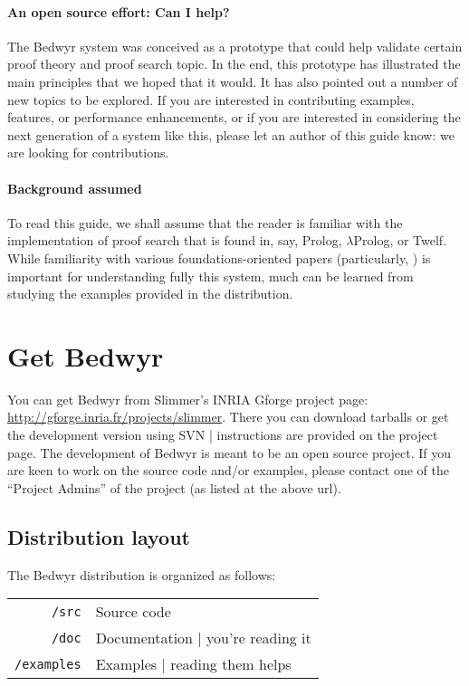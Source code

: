 \documentclass{article}
\newcommand{\lp}{$\lambda$Prolog}
\begin{document}
\paragraph{An open source effort: Can I help?}
The Bedwyr system was conceived as a prototype that could help
validate certain proof theory and proof search topic.  In the end,
this prototype has illustrated the main principles that we hoped that
it would.  It has also pointed out a number of new topics to be
explored.  If you are interested in contributing examples, features,
or performance enhancements, or if you are interested in considering
the next generation of a system like this, please let an author of
this guide know: we are looking for contributions.

\paragraph{Background assumed}
To read this guide, we shall assume that the reader is familiar with
the implementation of proof search that is found in, say, Prolog, \lp,
or Twelf.  While familiarity with various foundations-oriented papers
(particularly, \cite{mcdowell03tcs, miller05tocl,tiu04phd}) is
important for understanding fully this system, much can be learned
from studying the examples provided in the distribution.

\section{Get Bedwyr}
\label{sec:install}

You can get Bedwyr from Slimmer's INRIA Gforge project page:
\url{http://gforge.inria.fr/projects/slimmer}.
There you can download tarballs or get the development version using SVN
| instructions are provided on the project page.  The development of
Bedwyr is meant to be an open source project.  If you are keen
to work on the source code and/or examples, please contact
one of the ``Project Admins'' of the project (as listed at the above url).

\subsection{Distribution layout}

The Bedwyr distribution is organized as follows:

\begin{tabular}{r@{\quad}l}
  \texttt{/src}      & Source code \\
  \texttt{/doc}      &  Documentation | you're reading it \\
  \texttt{/examples} &  Examples | reading them helps
\end{tabular}
\end{document}
